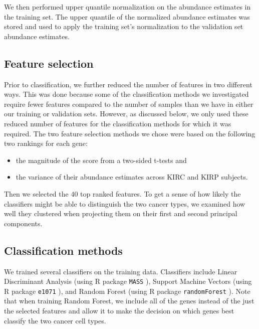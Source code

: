We then performed upper quantile normalization on the abundance estimates in
the training set. The upper quantile of the normalized abundance estimates was
stored and used to apply the training set's normalization to the validation set
abundance estimates.

\subsection*{Feature selection}

Prior to classification, we further reduced the number of features in two
different ways.  This was done because some of the classification methods
we investigated require fewer features compared to the number of samples
than we have in either our training or validation sets.  However, as discussed
below, we only used these reduced number of features for the classification
methods for which it was required.  The two feature selection methods we
chose were based on the following two rankings for each gene:

\begin{itemize}

\item the magnitude of the score from a two-sided t-tests and

\item the variance of their abundance estimates across
KIRC and KIRP subjects.

\end{itemize}

Then we selected the $40$ top ranked features.  To get a sense of how
likely the classifiers might be able to distinguish the two cancer types, we
examined how well they clustered when projecting them on their first and second
principal components.

\subsection*{Classification methods}

We trained several classifiers on the training data. Classifiers include Linear
Discriminant Analysis (using R package \texttt{MASS} \cite{rclassmass}),
Support Machine Vectors (using R package \texttt{e1071} \cite{e1071}), and
Random Forest (using R package \texttt{randomForest} \cite{randforest}).  Note
that when training Random Forest, we include all of the genes instead of the
just the selected features and allow it to make the decision on which genes
best classify the two cancer cell types.

